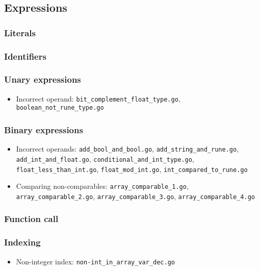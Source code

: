 \documentclass{article}
\begin{document}
\subsection*{Expressions}

\subsubsection*{Literals}
\subsubsection*{Identifiers}
\subsubsection*{Unary expressions}

\begin{itemize}
\item Incorrect operand: \texttt{bit_complement_float_type.go}, \texttt{boolean_not_rune_type.go}
\end{itemize}

\subsubsection*{Binary expressions}

\begin{itemize}
\item Incorrect operands: \texttt{add_bool_and_bool.go}, \texttt{add_string_and_rune.go}, \texttt{add_int_and_float.go}, \texttt{conditional_and_int_type.go}, \texttt{float_less_than_int.go}, \texttt{float_mod_int.go}, \texttt{int_compared_to_rune.go}
\item Comparing non-comparables: \texttt{array_comparable_1.go}, \texttt{array_comparable_2.go}, \texttt{array_comparable_3.go}, \texttt{array_comparable_4.go}
\end{itemize}

\subsubsection*{Function call}
\subsubsection*{Indexing}

\begin{itemize}
\item Non-integer index: \texttt{non-int_in_array_var_dec.go}

\end{itemize}
\end{document}
